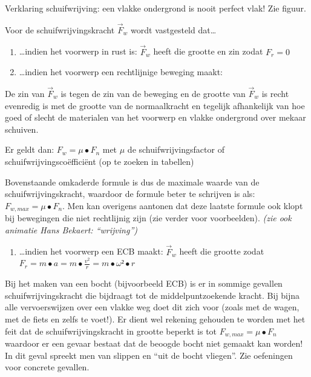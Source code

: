 \documentclass{ximera}
\begin{document}
Verklaring schuifwrijving: een vlakke ondergrond is nooit perfect vlak!
Zie figuur.

Voor de schuifwrijvingskracht \({\overrightarrow{F}}_{w}\) wordt vastgesteld dat\ldots{}

\begin{enumerate}
\item\ldots indien het voorwerp in rust is: \({\overrightarrow{F}}_{w}\) heeft die grootte en zin zodat \(F_{r} = 0\)
\item\ldots indien het voorwerp een rechtlijnige beweging maakt:
\end{enumerate}

De zin van \({\overrightarrow{F}}_{w}\) is tegen de zin van de beweging en de grootte van \({\overrightarrow{F}}_{w}\) is recht evenredig is met de grootte van de normaalkracht en tegelijk afhankelijk van hoe goed of slecht de materialen van het voorwerp en vlakke ondergrond over mekaar schuiven.

Er geldt dan: \(F_{w} = \mu \bullet F_{n}\) met \(\mu\) de schuifwrijvingsfactor of schuifwrijvingscoëfficiënt (op te zoeken in tabellen)

Bovenstaande omkaderde formule is dus de maximale waarde van de schuifwrijvingskracht, waardoor de formule beter te schrijven is als: \(F_{w,max} = \mu \bullet F_{n}\). 
Men kan overigens aantonen dat deze laatste formule ook klopt bij bewegingen die niet rechtlijnig zijn (zie verder voor voorbeelden). 
\textit{(zie ook animatie Hans Bekaert: ``wrijving'')}

\begin{enumerate}
\def\labelenumi{\alph{enumi})}
\setcounter{enumi}{2}
\item
  \ldots indien het voorwerp een ECB maakt: \({\overrightarrow{F}}_{w}\)
  heeft die grootte zodat
  \(F_{r} = m \bullet a = m \bullet \frac{v^{2}}{r} = m \bullet \omega ² \bullet r\)
\end{enumerate}

Bij het maken van een bocht (bijvoorbeeld ECB) is er in sommige gevallen schuifwrijvingskracht die bijdraagt tot de middelpuntzoekende kracht. 
Bij bijna alle vervoerswijzen over een vlakke weg doet dit zich voor (zoals met de wagen, met de fiets en zelfs te voet!). 
Er dient wel rekening gehouden te worden met het feit dat de schuifwrijvingskracht in grootte beperkt is tot \(F_{w,max} = \mu \bullet F_{n}\) waardoor er een gevaar bestaat dat de beoogde bocht niet gemaakt kan worden! 
In dit geval spreekt men van slippen en ``uit de bocht vliegen''. 
Zie oefeningen voor concrete gevallen.
\end{document}
